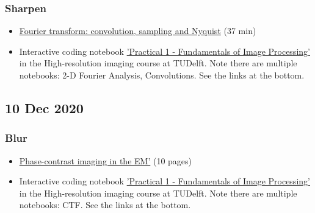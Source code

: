 \documentclass[11pt, oneside]{article}   	%
\begin{document}
\subsubsection{Sharpen}
\begin{itemize}
	\item \href{https://yale.app.box.com/s/00d0q34y1ef8qdfw3peo0r2jvcdf3hb3}{Fourier transform: convolution, sampling and Nyquist} (37 min)
	\item Interactive coding notebook \href{https://gitlab.tudelft.nl/aj-lab/teaching/-/wikis/NB4020}{'Practical 1 - Fundamentals of Image Processing'} in the High-resolution imaging course at TUDelft. Note there are multiple notebooks: 2-D Fourier Analysis, Convolutions. See the links at the bottom.

\end{itemize}

\pagebreak
\subsection{10 Dec 2020}
\subsubsection{Blur}
\begin{itemize}
	\item \href{https://cryoemprinciples.yale.edu/sites/default/files/files/2%20Phase%20contrast.pdf}{Phase-contrast imaging in the EM'} (10 pages)
	\item Interactive coding notebook \href{https://gitlab.tudelft.nl/aj-lab/teaching/-/wikis/NB4020}{'Practical 1 - Fundamentals of Image Processing'} in the High-resolution imaging course at TUDelft. Note there are multiple notebooks: CTF. See the links at the bottom.

\end{itemize}
\end{document}

